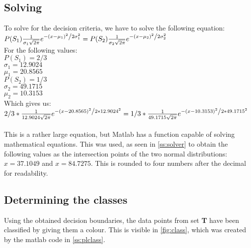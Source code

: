 \documentclass[10pt,a4paper]{article}
\begin{document}
\subsection{Solving}\label{ss:solving}
To solve for the decision criteria, we have to solve the following equation:\\
$
P(S_1) \frac{1}{{\sigma_1 \sqrt {2\pi } }}e^{{{ - \left( {x - \mu_1 } \right)^2 } \mathord{\left/ {\vphantom {{ - \left( {x - \mu_1 } \right)^2 } {2\sigma_1 ^2 }}} \right. \kern-\nulldelimiterspace} {2\sigma_1 ^2 }}} = P(S_2) \frac{1}{{\sigma_2 \sqrt {2\pi } }}e^{{{ - \left( {x - \mu_2 } \right)^2 } \mathord{\left/ {\vphantom {{ - \left( {x - \mu_2 } \right)^2 } {2\sigma_2 ^2 }}} \right. \kern-\nulldelimiterspace} {2\sigma_2 ^2 }}}
$\\
For the following values:\\
$P(S_1) = 2/3$\\
$\sigma_1 = 12.9024$\\
$\mu_1 = 20.8565$\\
$P(S_2) = 1/3$\\
$\sigma_2 = 49.1715$\\
$\mu_2 = 10.3153$\\
Which gives us:\\
$
2/3 * \frac{1}{{12.9024 \sqrt {2\pi } }}e^{{{ - \left( {x - 20.8565 } \right)^2 } \mathord{\left/ {\vphantom {{ - \left( {x - 20.85651 } \right)^2 } {2 * 12.9024 ^2 }}} \right. \kern-\nulldelimiterspace} {2 * 12.9024 ^2 }}} = 1/3 * \frac{1}{{49.1715 \sqrt {2\pi } }}e^{{{ - \left( {x - 10.3153 } \right)^2 } \mathord{\left/ {\vphantom {{ - \left( {x - 10.3153 } \right)^2 } {2 * 49.1715 ^2 }}} \right. \kern-\nulldelimiterspace} {2 * 49.1715 ^2 }}}
$\\
\\
This is a rather large equation, but Matlab has a function capable of solving mathematical equations. This was used, as seen in \autoref{ss:solver} to obtain the following values as the intersection points of the two normal distributions: $ x = 37.1049$ and $x = 84.7275$. This is rounded to four numbers after the decimal for readability.

\subsection{Determining the classes}
Using the obtained decision boundaries, the data points from set \textbf{T} have been classified by giving them a colour. This is visible in \autoref{fig:class}, which was created by the matlab code in \autoref{ss:plclass}.
\end{document}
